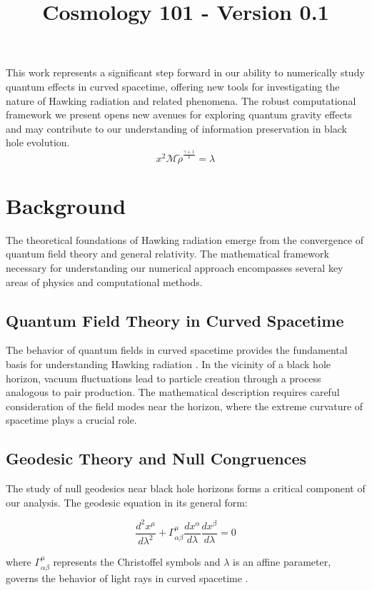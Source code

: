 \documentclass{article}\usepackage{graphicx} \usepackage{amsmath} \usepackage{colortbl}\title{Cosmology 101 - Version 0.1}
\begin{document}
This work represents a significant step forward in our ability to numerically study quantum effects in curved spacetime, offering new tools for investigating the nature of Hawking radiation and related phenomena. The robust computational framework we present opens new avenues for exploring quantum gravity effects and may contribute to our understanding of information preservation in black hole evolution.
 \begin{equation}x^2 \mathcal{M} \tilde{\rho }^{\frac{\gamma +1}{2}}=\lambda \label{Mi ecuacion 8} \end{equation}\section{Background}

The theoretical foundations of Hawking radiation emerge from the convergence of quantum field theory and general relativity. The mathematical framework necessary for understanding our numerical approach encompasses several key areas of physics and computational methods.

\subsection{Quantum Field Theory in Curved Spacetime}
The behavior of quantum fields in curved spacetime provides the fundamental basis for understanding Hawking radiation \cite{hawking1975}. In the vicinity of a black hole horizon, vacuum fluctuations lead to particle creation through a process analogous to pair production. The mathematical description requires careful consideration of the field modes near the horizon, where the extreme curvature of spacetime plays a crucial role.

\subsection{Geodesic Theory and Null Congruences}
The study of null geodesics near black hole horizons forms a critical component of our analysis. The geodesic equation in its general form:

\begin{equation}
\frac{d^2x^\mu}{d\lambda^2} + \Gamma^\mu_{\alpha\beta}\frac{dx^\alpha}{d\lambda}\frac{dx^\beta}{d\lambda} = 0
\end{equation}

where $\Gamma^\mu_{\alpha\beta}$ represents the Christoffel symbols and $\lambda$ is an affine parameter, governs the behavior of light rays in curved spacetime \cite{parker1969}.
\end{document}
